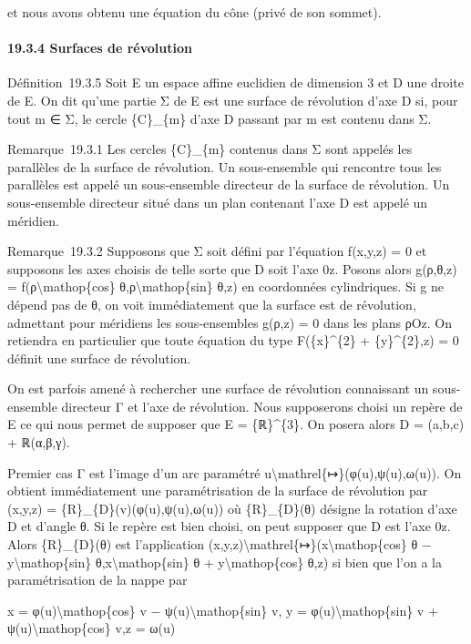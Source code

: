 \documentclass[]{article}
\begin{document}
et nous avons obtenu une équation du cône (privé de son sommet).

\paragraph{19.3.4 Surfaces de révolution}

Définition~19.3.5 Soit E un espace affine euclidien de dimension 3 et D
une droite de E. On dit qu'une partie Σ de E est une surface de
révolution d'axe D si, pour tout m ∈ Σ, le cercle \{C\}\_\{m\} d'axe D
passant par m est contenu dans Σ.

Remarque~19.3.1 Les cercles \{C\}\_\{m\} contenus dans Σ sont appelés
les parallèles de la surface de révolution. Un sous-ensemble qui
rencontre tous les parallèles est appelé un sous-ensemble directeur de
la surface de révolution. Un sous-ensemble directeur situé dans un plan
contenant l'axe D est appelé un méridien.

Remarque~19.3.2 Supposons que Σ soit défini par l'équation f(x,y,z) = 0
et supposons les axes choisis de telle sorte que D soit l'axe 0z. Posons
alors g(ρ,θ,z) = f(ρ\textbackslash{}mathop\{cos\}
θ,ρ\textbackslash{}mathop\{sin\} θ,z) en coordonnées cylindriques. Si g
ne dépend pas de θ, on voit immédiatement que la surface est de
révolution, admettant pour méridiens les sous-ensembles g(ρ,z) = 0 dans
les plans ρOz. On retiendra en particulier que toute équation du type
F(\{x\}\^{}\{2\} + \{y\}\^{}\{2\},z) = 0 définit une surface de
révolution.

On est parfois amené à rechercher une surface de révolution connaissant
un sous-ensemble directeur Γ et l'axe de révolution. Nous supposerons
choisi un repère de E ce qui nous permet de supposer que E =
\{ℝ\}\^{}\{3\}. On posera alors D = (a,b,c) + ℝ(α,β,γ).

Premier cas Γ est l'image d'un arc paramétré
u\textbackslash{}mathrel\{↦\}(φ(u),ψ(u),ω(u)). On obtient immédiatement
une paramétrisation de la surface de révolution par (x,y,z) =
\{R\}\_\{D\}(v)(φ(u),ψ(u),ω(u)) où \{R\}\_\{D\}(θ) désigne la rotation
d'axe D et d'angle θ. Si le repère est bien choisi, on peut supposer que
D est l'axe 0z. Alors \{R\}\_\{D\}(θ) est l'application
(x,y,z)\textbackslash{}mathrel\{↦\}(x\textbackslash{}mathop\{cos\} θ −
y\textbackslash{}mathop\{sin\} θ,x\textbackslash{}mathop\{sin\} θ +
y\textbackslash{}mathop\{cos\} θ,z) si bien que l'on a la
paramétrisation de la nappe par

x = φ(u)\textbackslash{}mathop\{cos\} v −
ψ(u)\textbackslash{}mathop\{sin\} v, y =
φ(u)\textbackslash{}mathop\{sin\} v + ψ(u)\textbackslash{}mathop\{cos\}
v,z = ω(u)
\end{document}
